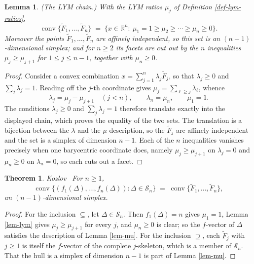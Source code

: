 \documentclass[11pt, a4paper, abstract=yes]{scrartcl}
\theoremstyle{definition}
\theoremstyle{remark}
\theoremstyle{plain}
\newtheorem{lemma}[definition]{Lemma}
\newtheorem{theorem}[definition]{Theorem}
\newcommand{\conv}{\operatorname{conv}}
\begin{document}
\begin{lemma}
(\emph{The LYM chain.}) With the LYM ratios \(\mu_j\) of Definition \ref{def-lym-ratios},
\begin{equation}\label{eq:mu}
  \conv\lbrace\tilde F_1,\dots,\tilde F_n\rbrace
  \;=\;\lbrace x\in\mathbb R^n:\ \mu_1=1\ge\mu_2\ge\cdots\ge\mu_n\ge0\rbrace .
\end{equation}
Moreover the points \(\tilde F_1,\dots,\tilde F_n\) are affinely independent, so this set is an
\((n-1)\)-dimensional simplex; and for \(n\ge2\) its facets are cut out by the \(n\) inequalities
\(\mu_j\ge\mu_{j+1}\) for \(1\le j\le n-1\), together with \(\mu_n\ge0\).
\label{lem:mu}
\label{lem-mu}
\end{lemma}

\begin{proof}
Consider a convex combination \(x=\sum_{j=1}^n\lambda_j\tilde F_j\), so that \(\lambda_j\ge0\) and
\(\sum_j\lambda_j=1\). Reading off the \(j\)-th coordinate gives \(\mu_j=\sum_{\ell\ge j}\lambda_\ell\),
whence
\begin{equation}\label{eq:mu-2}
  \lambda_j=\mu_j-\mu_{j+1}\quad(j<n),\qquad \lambda_n=\mu_n,\qquad \mu_1=1 .
\end{equation}
The conditions \(\lambda_j\ge0\) and \(\sum_j\lambda_j=1\) therefore translate exactly into the
displayed chain, which proves the equality of the two sets. The translation is a bijection between
the \(\lambda\) and the \(\mu\) description, so the \(\tilde F_j\) are affinely independent and the
set is a simplex of dimension \(n-1\). Each of the \(n\) inequalities vanishes precisely when one
barycentric coordinate does, namely \(\mu_j\ge\mu_{j+1}\) on \(\lambda_j=0\) and \(\mu_n\ge0\) on
\(\lambda_n=0\), so each cuts out a facet.
\end{proof}

\begin{theorem}
Kozlov~\cite[Theorem 4.1]{Kozlov1997} For \(n\ge1\),
\begin{equation}\label{eq:kozlov}
  \conv\bigl\lbrace(f_1(\Delta),\dots,f_n(\Delta)):\Delta\in\mathcal S_n\bigr\rbrace
  \;=\;\conv\lbrace\tilde F_1,\dots,\tilde F_n\rbrace,
\end{equation}
an \((n-1)\)-dimensional simplex.
\label{thm:kozlov}
\label{thm-kozlov}
\end{theorem}

\begin{proof}
For the inclusion \(\subseteq\), let \(\Delta\in\mathcal S_n\). Then \(f_1(\Delta)=n\) gives
\(\mu_1=1\), Lemma \ref{lem-lym} gives \(\mu_j\ge\mu_{j+1}\) for every \(j\), and \(\mu_n\ge0\) is
clear; so the \(f\)-vector of \(\Delta\) satisfies the description of Lemma \ref{lem-mu}. For the
inclusion \(\supseteq\), each \(\tilde F_j\) with \(j\ge1\) is itself the \(f\)-vector of the complete
\(j\)-skeleton, which is a member of \(\mathcal S_n\). That the hull is a simplex of dimension
\(n-1\) is part of Lemma \ref{lem-mu}.
\end{proof}
\end{document}
